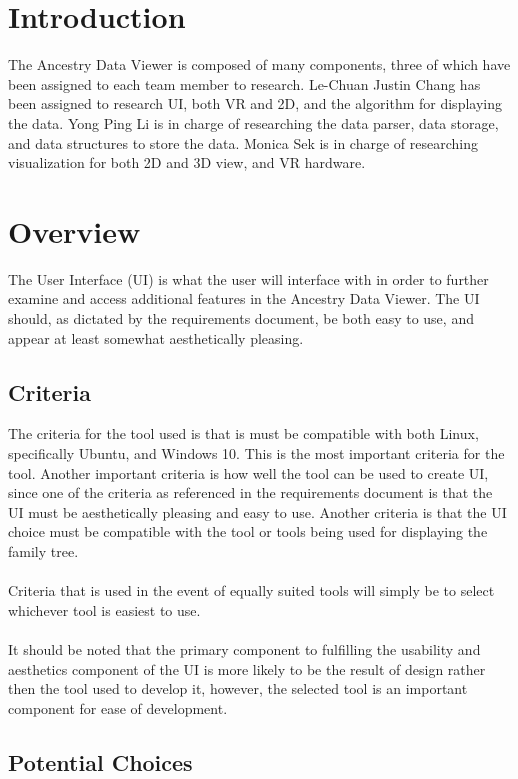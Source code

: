 \documentclass[onecolumn, draftclsnofoot,10pt, compsoc]{IEEEtran}
\begin{document}
\section{Introduction}
The Ancestry Data Viewer is composed of many components, three of which have been assigned to each team member to research. Le-Chuan Justin Chang has been assigned to research UI, both VR and 2D, and the algorithm for displaying the data. Yong Ping Li is in charge of researching the data parser, data storage, and data structures to store the data. Monica Sek is in charge of researching visualization for both 2D and 3D view, and VR hardware.

\section{Overview}
The User Interface (UI) is what the user will interface with in order to further examine and access additional features in the Ancestry Data Viewer. The UI should, as dictated by the requirements document, be both easy to use, and appear at least somewhat aesthetically pleasing.

\subsection{Criteria}
The criteria for the tool used is that is must be compatible with both Linux, specifically Ubuntu, and Windows 10. This is the most important criteria for the tool. Another important criteria is how well the tool can be used to create UI, since one of the criteria as referenced in the requirements document is that the UI must be aesthetically pleasing and easy to use. Another criteria is that the UI choice must be compatible with the tool or tools being used for displaying the family tree.
\\
\\
Criteria that is used in the event of equally suited tools will simply be to select whichever tool is easiest to use. 
\\
\\
It should be noted that the primary component to fulfilling the usability and aesthetics component of the UI is more likely to be the result of design rather then the tool used to develop it, however, the selected tool is an important component for ease of development.
\subsection{Potential Choices}
\end{document}
